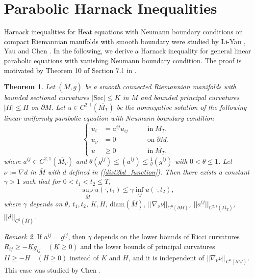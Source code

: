 \documentclass[12pt]{amsart}
\newtheorem{theorem}{Theorem}[section]
\theoremstyle{definition}
\theoremstyle{remark}
\newtheorem{remark}[theorem]{Remark}
\numberwithin{equation}{section}
\begin{document}
\appendix
\section{Parabolic Harnack Inequalities}
\label{Harnack.app}

Harnack inequalities for Heat equations with Neumann boundary conditions on compact Riemannian manifolds with smooth boundary were studied by Li-Yau \cite{LiYau86}, Yau \cite{Yau95} and Chen \cite{ChenR00}.
In the following, we derive a Harnack inequality for general linear parabolic equations with vanishing Neumann boundary condition. The proof is motivated by Theorem 10 of Section 7.1 in \cite{EvansBk}.

\begin{theorem}\label{Harnack_ineq_thm}
	Let $(\overline{M}, g)$ be a smooth connected Riemannian manifolds with bounded sectional curvatures $|\text{Sec}| \leq K $ in $\overline{M}$ and bounded principal curvatures $|I\!\!I| \leq H$ on $\partial M$. Let $u \in C^{2, 1}(\overline{M_T})$ be the nonnegative solution of the following linear uniformly parabolic equation with Neumann boundary condition
	\begin{equation}\label{eq_Harnack}
	\left\{
	\begin{aligned}
	u_t &= a^{ij}u_{ij} \qquad &\text{in}\; M_T, \\ 
	u_\nu &= 0 \qquad &\text{on} \; \partial M,   \\
	u &\geq 0 \qquad &\text{in} \; \overline{M_T},
	\end{aligned}
	\right.
	\end{equation}
	where $a^{ij} \in C^{2, 1}(\overline{M_T})$ and $\theta( g^{ij}) \leq (a^{ij}) \leq \frac{1}{\theta} (g^{ij})$ with $0 < \theta \leq 1$. 
	Let $\nu := \nabla d$ in $\overline{M}$ with $d$ defined in (\ref{dist2bd_function}).
	Then there exists a constant $\gamma > 1$ such that for $0 < t_1 < t_2 \leq T$,
	\begin{equation}\label{Harnack's_ineq}
	\sup_{\overline{M}} u(\cdot, t_1) \leq \gamma \inf_{\overline{M}} u(\cdot, t_2),
	\end{equation}
	where $\gamma$ depends on $\theta$, $t_1, t_2$, $K, H$,  $\text{diam}(\overline{M})$, $||\nabla_\nu \nu||_{C^0(\partial M)}$, $||a^{ij}||_{C^{2, 1}(\overline{M_T})}$,  $||d||_{C^2(\overline{M})}$.
\end{theorem}
\begin{remark}
	If $a^{ij} = g^{ij}$, then $\gamma$ depends on the lower bounds of Ricci curvatures $R_{ij} \geq -\underline{K} g_{ij} \quad (\underline{K} \geq 0)$ and the lower bounds of principal curvatures $I\!\!I \geq -\underline{H} \quad (\underline{H} \geq 0)$ instead of $K$ and $H$, and it is independent of $||\nabla_\nu \nu||_{C^0(\partial M)}$. This case was studied by Chen \cite{ChenR00}.
\end{remark}
\end{document}
